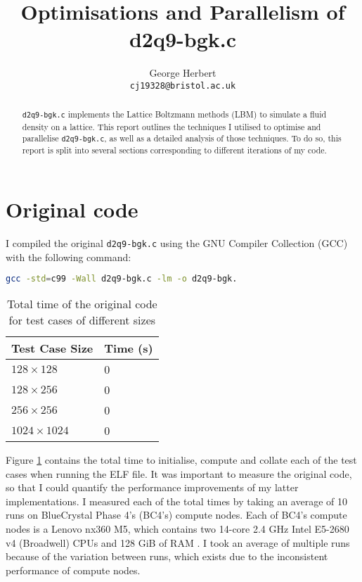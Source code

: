 \documentclass[11pt, twocolumn, a4paper]{article}
\author{
    George Herbert\\
    \texttt{cj19328@bristol.ac.uk}
}
\title{Optimisations and Parallelism of d2q9-bgk.c}
\begin{document}
\maketitle

\begin{abstract}
    \texttt{d2q9-bgk.c} implements the Lattice Boltzmann methods (LBM) to simulate a fluid density on a lattice.
    This report outlines the techniques I utilised to optimise and parallelise \texttt{d2q9-bgk.c}, as well as a detailed analysis of those techniques.
    To do so, this report is split into several sections corresponding to different iterations of my code.
\end{abstract}

\section{Original code}

I compiled the original \texttt{d2q9-bgk.c} using the GNU Compiler Collection (GCC) with the following command:
\begin{lstlisting}[language=bash, breaklines=true]
gcc -std=c99 -Wall d2q9-bgk.c -lm -o d2q9-bgk.
\end{lstlisting}

\begin{table}[htbp]
    \begin{center}
    \caption{Total time of the original code for test cases of different sizes}\label{tab:original}
    \begin{tabular}{l | l} 
        \hline\hline
        Test Case Size&Time (s)\\
        \hline
        $128 \times 128$&0\\
        $128 \times 256$&0\\
        $256 \times 256$&0\\
        $1024 \times 1024$&0\\
        \hline
      \end{tabular}
    \end{center}
\end{table} 


Figure \ref{tab:original} contains the total time to initialise, compute and collate each of the test cases when running the ELF file.
It was important to measure the original code, so that I could quantify the performance improvements of my latter implementations.
I measured each of the total times by taking an average of 10 runs on BlueCrystal Phase 4's (BC4's) compute nodes.
Each of BC4's compute nodes is a Lenovo nx360 M5, which contains two 14-core 2.4 GHz Intel E5-2680 v4 (Broadwell) CPUs and 128 GiB of RAM \cite{bcp4}.
I took an average of multiple runs because of the variation between runs, which exists due to the inconsistent performance of compute nodes.
\end{document}
